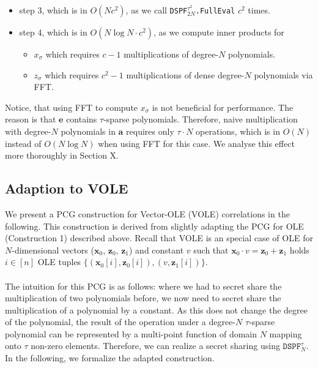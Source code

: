 \begin{itemize}
\item step 3, which is in $O(Nc^2)$, as we call \texttt{DSPF$^{\tau^2}_{2N}$.FullEval} $c^2$ times.
\item step 4, which is in $O(N\log N \cdot c^2)$, as we compute inner products for
\begin{itemize}
\item $x_{\sigma}$ which requires $c-1$ multiplications of degree-$N$ polynomials.
\item $z_{\sigma}$ which requires $c^2-1$ multiplications of dense degree-$N$ polynomials via FFT.
\end{itemize}
\end{itemize}

Notice, that using FFT to compute $x_{\sigma}$ is not beneficial for performance. The reason is that $\boldsymbol{e}$ contains $\tau$-sparse polynomials. Therefore, naive multiplication with degree-$N$ polynomials in $\boldsymbol{a}$ requires only $\tau\cdot N$ operations, which is in $O(N)$ instead of $O(N\log N)$ when using FFT for this case. We analyse this effect more thoroughly in Section \todo X.

\subsection{Adaption to VOLE}
We present a PCG construction for Vector-OLE (VOLE) correlations in the following. This construction is derived from slightly adapting the PCG for OLE (Construction 1) described above. Recall that VOLE is an special case of OLE for $N$-dimensional vectors ($\mathbf{x}_0$, $\mathbf{z}_0$, $\mathbf{z}_1$) and constant $v$ such that $\mathbf{x}_0\cdot v = \mathbf{z}_0 + \mathbf{z}_1$ holds $i \in [n]$ OLE tuples $\{(\mathbf{x}_0[i], \mathbf{z}_0[i]),(v, \mathbf{z}_1[i])\}$. 
\\\\
The intuition for this PCG is as follows: where we had to secret share the multiplication of two polynomials before, we now need to secret share the multiplication of a polynomial by a constant. As this does not change the degree of the polynomial, the result of the operation under a degree-$N$ $\tau$-sparse polynomial can be represented by a multi-point function of domain $N$ mapping onto $\tau$ non-zero elements. Therefore, we can realize a secret sharing using $\texttt{DSPF}^{\tau}_{N}$. In the following, we formalize the adapted construction.

